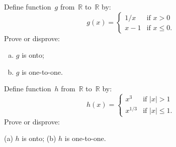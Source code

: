 \begin{exercise}{} \label{OntoCasesExer2}
 Define function~$g$ from~$\mathbb{R}$ to~$\mathbb{R}$ by:
$$ g(x) = 
\begin{cases}
1/x & \mbox{if $x > 0$} \\
x - 1 & \mbox{if $x \le 0$}
 . \end{cases} $$
Prove or disprove:
\begin{multicols}{2}
 \begin{enumerate}[(a)]
 \item \label{OntoCasesExer-gNotOnto}
 $g$ is onto;
 \item \label{OntoCasesExer-g11} 
 $g$ is one-to-one.
\end{enumerate}
\end{multicols}
\end{exercise}

\begin{exercise}{} \label{OntoCasesExer2}
 Define function~$h$ from~$\mathbb{R}$ to~$\mathbb{R}$ by:
$$ h(x) = 
\begin{cases}
x^{3} & \mbox{if $|x| > 1$} \\
x^{1/3} & \mbox{if $|x| \le 1$}
 . \end{cases} $$
Prove or disprove:

(a) \qquad  $h$ is onto; \qquad \qquad (b)  $h$ is one-to-one.
\end{exercise}




